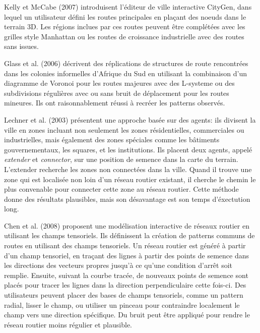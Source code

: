 \documentclass[11pt]{article}
\begin{document}
Kelly et McCabe (2007) introduisent l'éditeur de ville interactive CityGen, dans lequel un utilisateur défini les routes principales en plaçant des noeuds dans le terrain 3D. Les régions inclues par ces routes peuvent être complétées avec les grilles style Manhattan ou les routes de croissance industrielle avec des routes sans issues. \newline

Glass et al. (2006) décrivent des réplications de structures de route rencontrées dans les colonies informelles d'Afrique du Sud en utilisant la combinaison d'un diagramme de Voronoi pour les routes majeures avec des L-systeme ou des subdivisions régulières avec ou sans bruit de déplacement pour les routes mineures. Ils ont raisonnablement réussi à recréer les patterns observés. \newline

Lechner et al. (2003) présentent une approche basée sur des agents: ils divisent la ville en zones incluant non seulement les zones résidentielles, commerciales ou industrielles, mais également des zones spéciales comme les bâtiments gouvernementaux, les squares, et les institutions. Ils placent deux agents, appelé \textit{extender} et \textit{connector}, sur une position de semence dans la carte du terrain. L'extender recherche les zones non connectées dans la ville. Quand il trouve une zone qui est localisée non loin d'un réseau routier existant, il cherche le chemin le plus convenable pour connecter cette zone au réseau routier. Cette méthode donne des résultats plausibles, mais son désavantage est son temps d'éxectution long. \newline

Chen et al. (2008) proposent une modélisation interactive de réseaux routier en utilisant les champs tensoriels. Ils définissent la création de patterns communs de routes en utilisant des champs tensoriels. Un réseau routier est généré à partir d'un champ tensoriel, en traçant des lignes à partir des points de semence dans les directions des vecteurs propres jusqu'à ce qu'une condition d'arrêt soit remplie. Ensuite, suivant la courbe tracée, de nouveaux points de semence sont placés pour tracer les lignes dans la direction perpendiculaire cette fois-ci. Des utilisateurs peuvent placer des bases de champs tensoriels, comme un pattern radial, lisser le champ, ou utiliser un pinceau pour contraindre localement le champ vers une direction spécifique. Du bruit peut être appliqué pour rendre le réseau routier moins régulier et plausible. \newline
\end{document}
